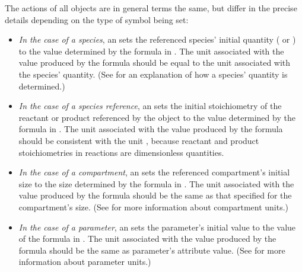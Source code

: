 The actions of all \InitialAssignment objects are in general terms
the same, but differ in the precise details depending on the type
of symbol being set:
\begin{itemize}

\item \emph{In the case of a species}, an \InitialAssignment sets
  the referenced species' initial quantity
  ( or ) to the value
  determined by the formula in .  The unit associated
  with the value produced by the  formula should be
  equal to the unit associated with the species' quantity.  (See
   for an explanation of how a
  species' quantity is determined.)

\item \emph{In the case of a species reference}, an
  \InitialAssignment sets the initial stoichiometry of the
  reactant or product referenced by the \SpeciesReference object
  to the value determined by the formula in .  The
  unit associated with the value produced by the 
  formula should be consistent with the unit
  , because reactant and product
  stoichiometries in reactions are dimensionless quantities.

\item \emph{In the case of a compartment}, an \InitialAssignment
  sets the referenced compartment's initial size to the size
  determined by the formula in .  The unit associated
  with the value produced by the  formula should be
  the same as that specified for the compartment's size.  (See
   for more information about
  compartment units.)

\item \emph{In the case of a parameter}, an \InitialAssignment
  sets the parameter's initial value to the value of the formula
  in .  The unit associated with the value produced by
  the  formula should be the same as parameter's
   attribute value.  (See
   for more information about
  parameter units.)


\end{itemize}

